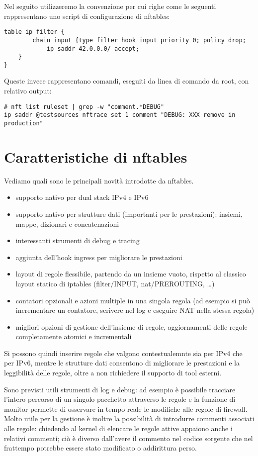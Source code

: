 Nel seguito utilizzeremo la convenzione per cui righe come le seguenti
rappresentano uno script di configurazione di nftables:
\begin{lstlisting}[style=customc]
table ip filter {
        chain input {type filter hook input priority 0; policy drop; 
        	ip saddr 42.0.0.0/ accept;
	}
}
\end{lstlisting}

Queste invece rappresentano comandi, eseguiti da linea di comando da root, con
relativo output:
\begin{lstlisting}
# nft list ruleset | grep -w "comment.*DEBUG"
ip saddr @testsources nftrace set 1 comment "DEBUG: XXX remove in production"
\end{lstlisting}

\section{Caratteristiche di nftables}
Vediamo quali sono le principali novit\`a introdotte da nftables.
\begin{itemize}
    \item supporto nativo per dual stack IPv4 e IPv6
    \item supporto nativo per strutture dati (importanti per le prestazioni):
    insiemi, mappe, dizionari e concatenazioni
    \item interessanti strumenti di debug e tracing
    \item aggiunta dell'hook ingress per migliorare le prestazioni
    \item layout di regole flessibile, partendo da un insieme vuoto, rispetto
    al classico layout statico di iptables (filter/INPUT, nat/PREROUTING,
    \ldots)
    \item contatori opzionali e azioni multiple in una singola regola (ad
        esempio si pu\`o incrementare un contatore, scrivere nel log e eseguire NAT nella
    stessa regola)
    \item migliori opzioni di gestione dell'insieme di regole, aggiornamenti
    delle regole completamente atomici e incrementali
\end{itemize}
Si possono quindi inserire regole che valgono contestualemnte sia per IPv4 che
per IPv6,
mentre le strutture dati consentono di migliorare le prestazioni e la
leggibilit\`a delle regole, oltre a non richiedere il supporto di tool
esterni.

Sono previsti utili strumenti di log e debug: ad esempio \`e possibile
tracciare l'intero percorso di un singolo pacchetto attraverso le regole e la
funzione di monitor permette di osservare in tempo reale le modifiche alle
regole di firewall.  Molto utile per la gestione è inoltre la possibilità di
introdurre commenti associati alle regole: chiedendo al kernel di elencare le
regole attive appaiono anche i relativi commenti; ci\`o \`e diverso dall'avere
il commento nel codice sorgente che nel frattempo potrebbe essere stato
modificato o addirittura perso.

